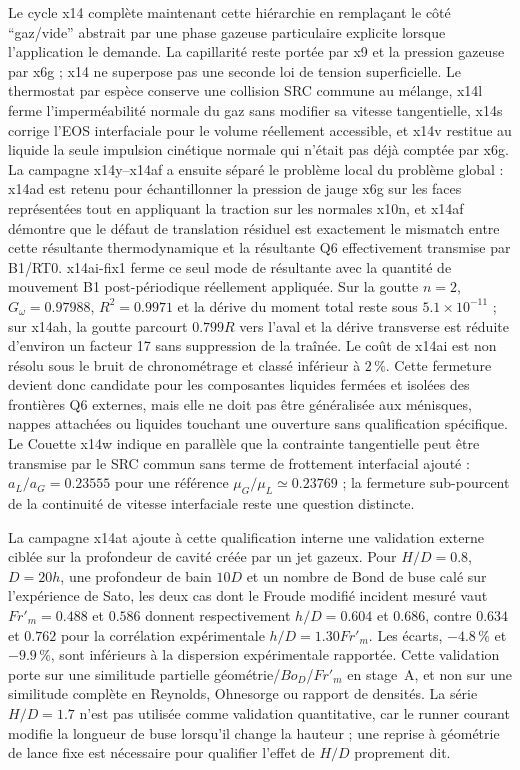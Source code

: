 \documentclass[11pt,a4paper]{article}
\begin{document}
Le cycle x14 complète maintenant cette hiérarchie en remplaçant le côté ``gaz/vide'' abstrait par une phase gazeuse particulaire explicite lorsque l'application le demande. La capillarité reste portée par x9 et la pression gazeuse par x6g ; x14 ne superpose pas une seconde loi de tension superficielle. Le thermostat par espèce conserve une collision SRC commune au mélange, x14l ferme l'imperméabilité normale du gaz sans modifier sa vitesse tangentielle, x14s corrige l'EOS interfaciale pour le volume réellement accessible, et x14v restitue au liquide la seule impulsion cinétique normale qui n'était pas déjà comptée par x6g. La campagne x14y--x14af a ensuite séparé le problème local du problème global : x14ad est retenu pour échantillonner la pression de jauge x6g sur les faces représentées tout en appliquant la traction sur les normales x10n, et x14af démontre que le défaut de translation résiduel est exactement le mismatch entre cette résultante thermodynamique et la résultante Q6 effectivement transmise par B1/RT0. x14ai-fix1 ferme ce seul mode de résultante avec la quantité de mouvement B1 post-périodique réellement appliquée. Sur la goutte $n=2$, $G_\omega=0.97988$, $R^2=0.9971$ et la dérive du moment total reste sous $5.1\times10^{-11}$ ; sur x14ah, la goutte parcourt $0.799R$ vers l'aval et la dérive transverse est réduite d'environ un facteur 17 sans suppression de la traînée. Le coût de x14ai est non résolu sous le bruit de chronométrage et classé inférieur à $2\,\%$. Cette fermeture devient donc candidate pour les composantes liquides fermées et isolées des frontières Q6 externes, mais elle ne doit pas être généralisée aux ménisques, nappes attachées ou liquides touchant une ouverture sans qualification spécifique. Le Couette x14w indique en parallèle que la contrainte tangentielle peut être transmise par le SRC commun sans terme de frottement interfacial ajouté : $a_L/a_G=0.23555$ pour une référence $\mu_G/\mu_L\simeq0.23769$ ; la fermeture sub-pourcent de la continuité de vitesse interfaciale reste une question distincte.


La campagne x14at ajoute à cette qualification interne une validation externe ciblée sur la profondeur de cavité créée par un jet gazeux. Pour $H/D=0.8$, $D=20h$, une profondeur de bain $10D$ et un nombre de Bond de buse calé sur l'expérience de Sato, les deux cas dont le Froude modifié incident mesuré vaut $Fr'_m=0.488$ et $0.586$ donnent respectivement $h/D=0.604$ et $0.686$, contre $0.634$ et $0.762$ pour la corrélation expérimentale $h/D=1.30Fr'_m$. Les écarts, $-4.8\,\%$ et $-9.9\,\%$, sont inférieurs à la dispersion expérimentale rapportée. Cette validation porte sur une similitude partielle géométrie/$Bo_D$/$Fr'_m$ en stage~A, et non sur une similitude complète en Reynolds, Ohnesorge ou rapport de densités. La série $H/D=1.7$ n'est pas utilisée comme validation quantitative, car le runner courant modifie la longueur de buse lorsqu'il change la hauteur ; une reprise à géométrie de lance fixe est nécessaire pour qualifier l'effet de $H/D$ proprement dit.
\end{document}
